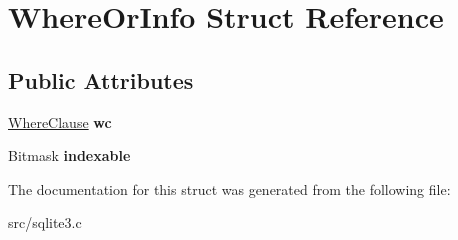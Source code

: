 \hypertarget{struct_where_or_info}{\section{Where\-Or\-Info Struct Reference}
\label{struct_where_or_info}
}
\subsection*{Public Attributes}
\begin{DoxyCompactItemize}
\item 
\hypertarget{struct_where_or_info_a45bb04e5ea24ec549f060bc8b210ec71}{\hyperlink{struct_where_clause}{Where\-Clause} {\bfseries wc}}\label{struct_where_or_info_a45bb04e5ea24ec549f060bc8b210ec71}

\item 
\hypertarget{struct_where_or_info_a39777f291e1e516f01b05b71a9805357}{Bitmask {\bfseries indexable}}\label{struct_where_or_info_a39777f291e1e516f01b05b71a9805357}

\end{DoxyCompactItemize}


The documentation for this struct was generated from the following file\-:\begin{DoxyCompactItemize}
\item 
src/sqlite3.\-c\end{DoxyCompactItemize}
